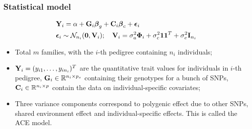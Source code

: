 \documentclass[handout,10pt]{beamer}
\begin{document}

\begin{frame}
\frametitle{Statistical model}
%
\begin{align*}
& {\mathbf{Y}}_i = \alpha + {\mathbf{G}}_i {\boldsymbol{\beta}}_g + {\mathbf{C}}_i {\boldsymbol{\beta}}_c + {\boldsymbol{\epsilon}}_i\\
& {\boldsymbol{\epsilon}}_i \sim {\cal{N}}_{n_i} ({\bf 0}, {\mathbf{V}}_i); \quad {\mathbf{V}}_i = \sigma_a^2 {\boldsymbol{\Phi}}_i + \sigma_c^2 {\bf 1} {\bf 1}^T + \sigma_e^2 {\mathbf{I}}_{n_i}
\end{align*}
%

\begin{itemize}

\item Total $m$ families, with the $i$-th pedigree containing $n_i$ individuals;

\vspace{1em}
\item ${\mathbf{Y}}_i = (y_{i 1}, \ldots, y_{i n_i})^T $ are the quantitative trait values for individuals in $i$-th pedigree, ${\mathbf{G}}_i \in {\mathbb{R}}^{ n_i \times p_s}$ containing their genotypes for a bunch of SNPs, ${\mathbf{C}}_i \in {\mathbb{R}}^{ n_i \times p}$ contain the data on individual-specific covariates;

\vspace{1em}
\item Three variance components correspond to polygenic effect due to other SNPs, shared environment effect and individual-specific effects. This is called the {\colbbf ACE model}.

\end{itemize}

\end{frame}
\end{document}
